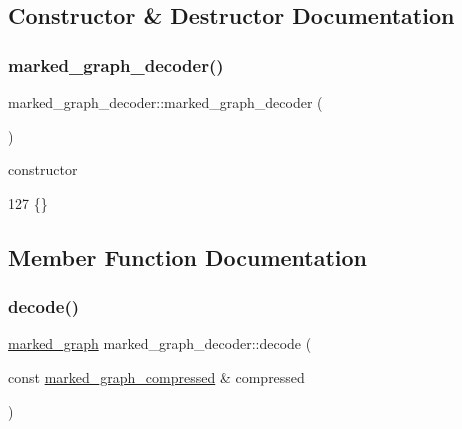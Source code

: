 \subsection{Constructor \& Destructor Documentation}
\mbox{\label{classmarked__graph__decoder_ad13aa15246efd3754b3ba7d2c28300d9}} 
\subsubsection{\texorpdfstring{marked\+\_\+graph\+\_\+decoder()}{marked\_graph\_decoder()}}
{\footnotesize\ttfamily marked\+\_\+graph\+\_\+decoder\+::marked\+\_\+graph\+\_\+decoder (\begin{DoxyParamCaption}{ }\end{DoxyParamCaption})\hspace{0.3cm}{\ttfamily [inline]}}



constructor 


\begin{DoxyCode}
127 \{\}
\end{DoxyCode}


\subsection{Member Function Documentation}
\mbox{\label{classmarked__graph__decoder_a31bbd76091acf5b058fd0a7b7948f74c}} 
\subsubsection{\texorpdfstring{decode()}{decode()}}
{\footnotesize\ttfamily \hyperlink{classmarked__graph}{marked\+\_\+graph} marked\+\_\+graph\+\_\+decoder\+::decode (\begin{DoxyParamCaption}\item[{const \hyperlink{classmarked__graph__compressed}{marked\+\_\+graph\+\_\+compressed} \&}]{compressed }\end{DoxyParamCaption})}


